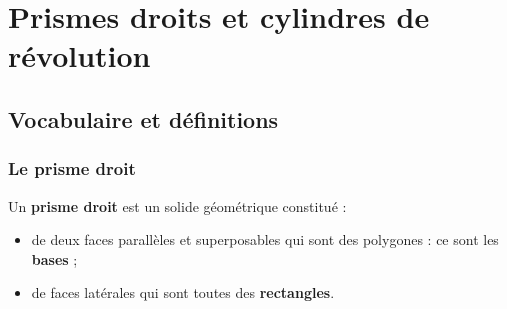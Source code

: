 \documentclass[a4paper]{book}
\begin{document}
\setcounter{chapter}{15}
\renewcommand{\monTitre}{Prismes droits et cylindres de révolution}
\chapter{\monTitre}
\thispagestyle{fancy}


\section{Vocabulaire et définitions}
\subsection{Le prisme droit}

    \begin{definition}
        Un \textbf{prisme droit} est un solide géométrique constitué :
        \begin{itemize}
            \item de deux faces parallèles et superposables qui sont des polygones : ce sont les \textbf{bases} ;
            \item de faces latérales qui sont toutes des \textbf{rectangles}.
        \end{itemize}
    \end{definition}
    
\end{document}
